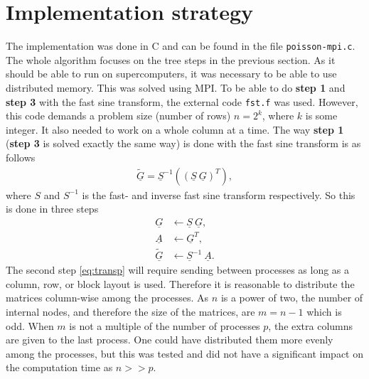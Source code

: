 \section{Implementation strategy}
%
The implementation was done in C and can be found in the file \verb+poisson-mpi.c+. The whole algorithm focuses on the tree steps in the previous section. As it should be able to run on supercomputers, it was necessary to be able to use distributed memory. This was solved using MPI. To be able to do \textbf{step 1} and \textbf{step 3} with the fast sine transform, the external code \verb+fst.f+ was used. However, this code demands a problem size (number of rows) $n = 2^k$, where $k$ is some integer. It also needed to work on a whole column at a time. The way \textbf{step 1} (\textbf{step 3} is solved exactly the same way) is done with the fast sine transform is as follows
%
\begin{align}
\underline{\tilde{G}} = \underline{S}^{-1} \left( (\underline{S} \: \underline{G})^T   \right),
\end{align}
%
where $S$ and $S^{-1}$ is the fast- and inverse fast sine transform respectively. So this is done in three steps
%
\begin{align}
  \underline{G} &\leftarrow \underline{S} \: \underline{G},\\
  \label{eq:transp} 
  \underline{A} &\leftarrow \underline{G}^T,\\
  \underline{\tilde G} &\leftarrow \underline{S}^{-1} \: \underline{A}.
\end{align}
%
The second step \eqref{eq:transp} will require sending between processes as long as a column, row, or block layout is used. Therefore it is reasonable to distribute the matrices column-wise among the processes. As $n$ is a power of two, the number of internal nodes, and therefore the size of the matrices, are $m = n-1$ which is odd. When $m$ is not a multiple of the number of processes $p$, the extra columns are given to the last process. One could have distributed them more evenly among the processes, but this was tested and did not have a significant impact on the computation time as $n >> p$.

